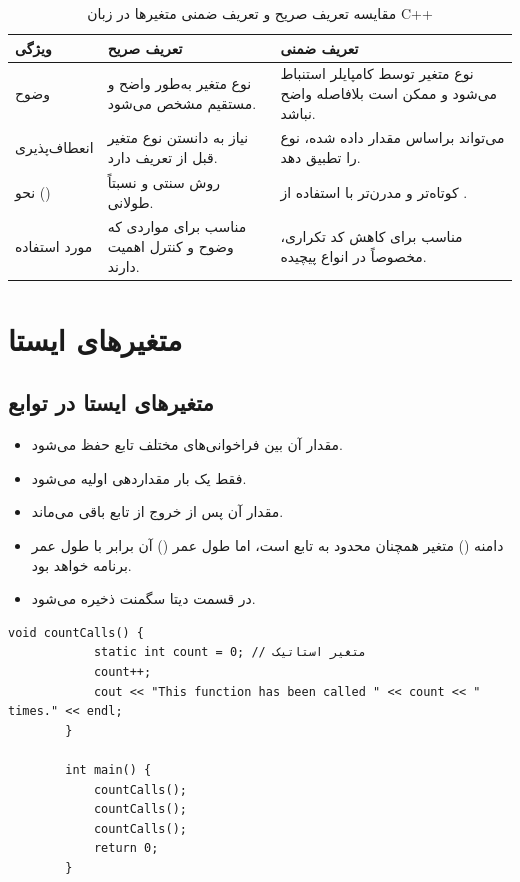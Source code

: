 \documentclass[12pt, a4paper]{report}
\begin{document}
\begin{table}[h!]
	\centering
	\begin{tabular}{|p{3cm}|p{5cm}|p{5cm}|}
		\hline
		\textbf{ویژگی} & \textbf{تعریف صریح} & \textbf{تعریف ضمنی} \\
		\hline
		وضوح & 
		نوع متغیر به‌طور واضح و مستقیم مشخص می‌شود. & 
		نوع متغیر توسط کامپایلر استنباط می‌شود و ممکن است بلافاصله واضح نباشد. \\
		\hline
		انعطاف‌پذیری & 
		نیاز به دانستن نوع متغیر قبل از تعریف دارد. & 
		می‌تواند براساس مقدار داده شده، نوع را تطبیق دهد. \\
		\hline
		نحو (\lr{Syntax}) & 
		روش سنتی و نسبتاً طولانی. & 
		کوتاه‌تر و مدرن‌تر با استفاده از \texttt{\lr{auto}}. \\
		\hline
		مورد استفاده & 
		مناسب برای مواردی که وضوح و کنترل اهمیت دارند. & 
		مناسب برای کاهش کد تکراری، مخصوصاً در انواع پیچیده. \\
		\hline
	\end{tabular}
	\caption{مقایسه تعریف صریح و تعریف ضمنی متغیرها در زبان C++}
	\label{tab:explicit_implicit}
\end{table}


\section{متغیرهای ایستا}

\subsection{متغیرهای ایستا در توابع}
\begin{itemize}
	\item مقدار آن بین فراخوانی‌های مختلف تابع حفظ می‌شود.
	\item فقط یک بار مقداردهی اولیه می‌شود.
	\item مقدار آن پس از خروج از تابع باقی می‌ماند.
	\item دامنه () متغیر همچنان محدود به تابع است، اما طول عمر () آن برابر با طول عمر برنامه خواهد بود.
	\item در قسمت دیتا سگمنت ذخیره می‌شود.
\end{itemize}


\begin{LTR} %
	\begin{lstlisting}[breaklines=true]
		void countCalls() {
			static int count = 0; // متغیر استاتیک
			count++;
			cout << "This function has been called " << count << " times." << endl;
		}
		
		int main() {
			countCalls();
			countCalls();
			countCalls();
			return 0;
		}
	\end{lstlisting}
\end{LTR}
\end{document}
